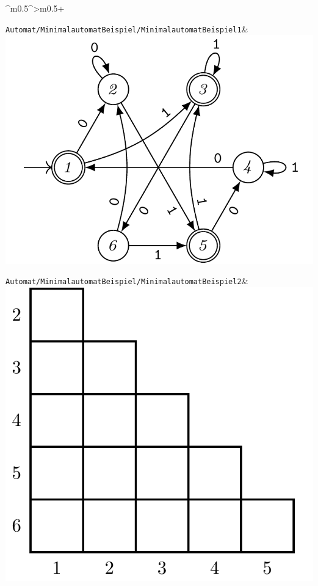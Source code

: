 \documentclass[PLAIN]{Lilly}
\begin{document}
\begin{tabularx}{\linewidth}{^m{0.5\linewidth}^>{\centering\arraybackslash}m{0.5\linewidth}+}
\midrule {} {}\verb|Automat/MinimalautomatBeispiel/MinimalautomatBeispiel1|& \includegraphics[width=0.8\linewidth]{Automat/MinimalautomatBeispiel/MinimalautomatBeispiel1-pdf.pdf}\\
\midrule {} {}\verb|Automat/MinimalautomatBeispiel/MinimalautomatBeispiel2|& \includegraphics[width=0.8\linewidth]{Automat/MinimalautomatBeispiel/MinimalautomatBeispiel2-pdf.pdf}\\

\end{tabularx}
\end{document}
